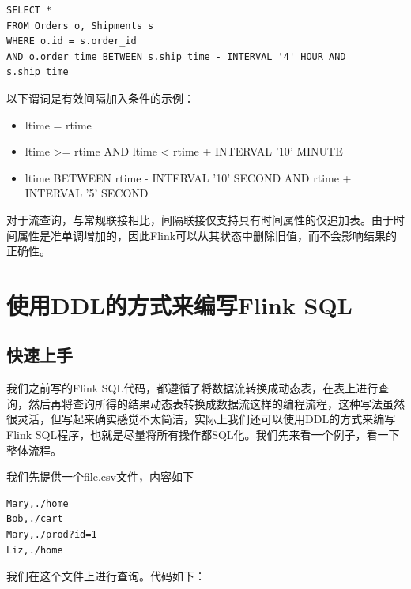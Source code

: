 \documentclass[cn,11pt,chinese]{elegantbook}
\begin{document}
\begin{verbatim}
SELECT *
FROM Orders o, Shipments s
WHERE o.id = s.order_id
AND o.order_time BETWEEN s.ship_time - INTERVAL '4' HOUR AND s.ship_time
\end{verbatim}

以下谓词是有效间隔加入条件的示例：

\begin{itemize}
  \item ltime = rtime
  \item ltime >= rtime AND ltime < rtime + INTERVAL '10' MINUTE
  \item ltime BETWEEN rtime - INTERVAL '10' SECOND AND rtime + INTERVAL '5' SECOND
\end{itemize}

对于流查询，与常规联接相比，间隔联接仅支持具有时间属性的仅追加表。由于时间属性是准单调增加的，因此Flink可以从其状态中删除旧值，而不会影响结果的正确性。

\section{使用DDL的方式来编写Flink SQL}

\subsection{快速上手}

我们之前写的Flink SQL代码，都遵循了将数据流转换成动态表，在表上进行查询，然后再将查询所得的结果动态表转换成数据流这样的编程流程，这种写法虽然很灵活，但写起来确实感觉不太简洁，实际上我们还可以使用DDL的方式来编写Flink SQL程序，也就是尽量将所有操作都SQL化。我们先来看一个例子，看一下整体流程。

我们先提供一个file.csv文件，内容如下

\begin{verbatim}
Mary,./home
Bob,./cart
Mary,./prod?id=1
Liz,./home
\end{verbatim}

我们在这个文件上进行查询。代码如下：
\end{document}
